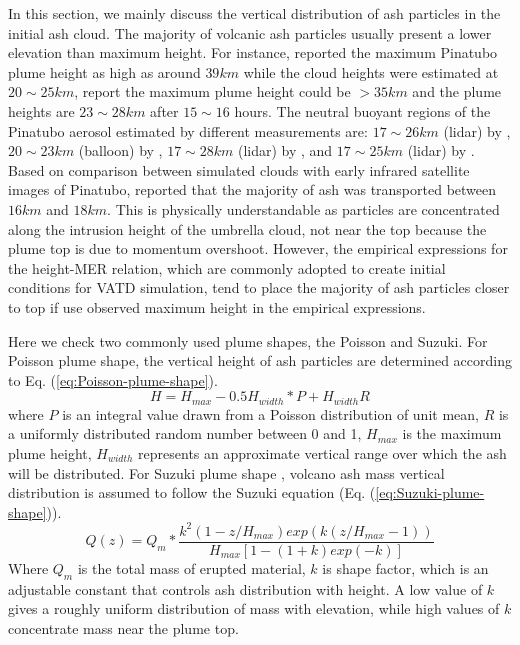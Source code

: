 \documentclass[draft,linenumbers]{agujournal2019}
\begin{document}
In this section, we mainly discuss the vertical distribution of ash particles in the initial ash cloud.
The majority of volcanic ash particles usually present a lower elevation than maximum height. For instance, \citet{holasek1996satellite, holasek1996experiments} reported the maximum Pinatubo plume height as high as around $39 km$ while the cloud heights were estimated at $20 \sim 25 km $, \citet{self1993atmospheric} report the maximum plume height could be $>35 km$ and the plume heights are $23 \sim 28 km$ after $15 \sim 16$ hours. The neutral buoyant regions of the Pinatubo aerosol estimated by different measurements are: $17 \sim 26 km$ (lidar) by \citet{defoor1992early}, $20 \sim 23 km$ (balloon) by \citet{deshler1992balloonborne}, $17 \sim 28 km$ (lidar) by \citet{jager1992pinatubo}, and $17 \sim 25 km$ (lidar) by \citet{avdyushin19931}. Based on comparison between simulated clouds with early infrared satellite images of Pinatubo, \citet{fero2008simulation} reported that the majority of ash was transported between $16 km$ and $18 km$. This is physically understandable as particles are concentrated along the intrusion height of the umbrella cloud, not near the top because the plume top is due to momentum overshoot. However, the empirical expressions for the height-MER relation, which are commonly adopted to create initial conditions for VATD simulation, tend to place the majority of ash particles closer to top if use observed maximum height in the empirical expressions.

Here we check two commonly used plume shapes, the Poisson and Suzuki.
For Poisson plume shape, the vertical height of ash particles are determined according to Eq. (\ref{eq:Poisson-plume-shape}).
\begin{equation}
H=H_{max} - 0.5 H_{width}*P+H_{width}R
\label{eq:Poisson-plume-shape}
\end{equation}
where $P$ is an integral value drawn from a Poisson distribution of unit mean, $R$ is a uniformly distributed random number between 0 and 1, $H_{max}$ is the maximum plume height, $H_{width}$ represents an approximate vertical range over which the ash will be distributed.
For Suzuki plume shape \citep{suzuki1983theoretical}, volcano ash mass vertical distribution is assumed to follow the Suzuki equation (Eq. (\ref{eq:Suzuki-plume-shape})).
\begin{equation}
Q(z)=Q_m* \frac{k^2(1-z/H_{max})exp\left(k(z/H_{max} -1 )\right)}{H_{max}\left[1-(1+k)exp(-k)\right]}
\label{eq:Suzuki-plume-shape}
\end{equation}
Where $Q_m$ is the total mass of erupted material, $k$ is shape factor, which is an adjustable constant that controls ash distribution with height. A low value of $k$ gives a roughly uniform distribution of mass with elevation, while high values of $k$ concentrate mass near the plume top.
\end{document}
